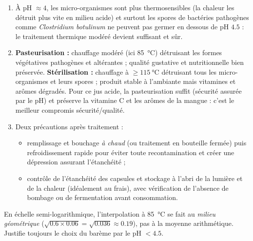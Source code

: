 \documentclass[11pt]{article}
\begin{document}
\begin{corrige}
\begin{enumerate}
Le traitement réalisé est environ 28 fois supérieur au minimum requis, soit une réduction théorique de plus de $10^{160}$ : la marge est très confortable et couvre les hétérogénéités de chauffage.
\item À pH $\approx 4$, les micro-organismes sont plus thermosensibles (la chaleur les détruit plus vite en milieu acide) et surtout les spores de bactéries pathogènes comme \emph{Clostridium botulinum} ne peuvent pas germer en dessous de pH $\num{4,5}$ : le traitement thermique modéré devient suffisant et sûr.
\item \textbf{Pasteurisation :} chauffage modéré (ici \SI{85}{\celsius}) détruisant les formes végétatives pathogènes et altérantes ; qualité gustative et nutritionnelle bien préservée. \textbf{Stérilisation :} chauffage à $\geq \SI{115}{\celsius}$ détruisant tous les micro-organismes et leurs spores ; produit stable à l'ambiante mais vitamines et arômes dégradés. Pour ce jus acide, la pasteurisation suffit (sécurité assurée par le pH) et préserve la vitamine C et les arômes de la mangue : c'est le meilleur compromis sécurité/qualité.
\item Deux précautions après traitement :
\begin{itemize}
\item remplissage et bouchage \emph{à chaud} (ou traitement en bouteille fermée) puis refroidissement rapide pour éviter toute recontamination et créer une dépression assurant l'étanchéité ;
\item contrôle de l'étanchéité des capsules et stockage à l'abri de la lumière et de la chaleur (idéalement au frais), avec vérification de l'absence de bombage ou de fermentation avant consommation.
\end{itemize}
\end{enumerate}
\end{corrige}

\begin{attention}
En échelle semi-logarithmique, l'interpolation à \SI{85}{\celsius} se fait au \emph{milieu géométrique} ($\sqrt{\num{0,6}\times\num{0,06}} = \sqrt{\num{0,036}} \approx \num{0,19}$), pas à la moyenne arithmétique. Justifie toujours le choix du barème par le pH $< \num{4,5}$.
\end{attention}
\end{document}
